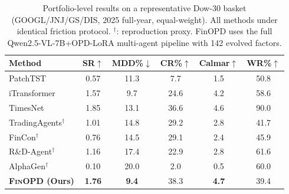 \begin{table}[t]
\renewcommand{\arraystretch}{0.95}
\footnotesize
\caption{Portfolio-level results on a representative Dow-30 basket (GOOGL/JNJ/GS/DIS, 2025 full-year, equal-weight). All methods under identical friction protocol. $^\dagger$: reproduction proxy. FinOPD uses the full Qwen2.5-VL-7B+OPD-LoRA multi-agent pipeline with 142 evolved factors.}
\setlength{\abovecaptionskip}{0.1cm}
\centering
\setlength{\tabcolsep}{3pt}
\begin{tabular}{lccccc}
\toprule
Method & SR$\uparrow$ & MDD\%$\downarrow$ & CR\%$\uparrow$ & Calmar$\uparrow$ & WR\%$\uparrow$ \\
\midrule
PatchTST & 0.57 & 11.3 & 7.7 & 1.5 & 50.8 \\
iTransformer & 1.57 & 9.7 & 24.6 & 4.2 & 58.6 \\
TimesNet & 1.85 & 13.1 & 36.6 & 4.6 & 90.0 \\
\midrule
TradingAgents$^\dagger$ & 1.01 & 14.8 & 29.2 & 2.8 & 41.7 \\
FinCon$^\dagger$ & 0.76 & 14.5 & 29.1 & 2.4 & 45.9 \\
R\&D-Agent$^\dagger$ & 1.16 & 17.4 & 22.9 & 2.8 & 61.6 \\
AlphaGen$^\dagger$ & 0.10 & 20.0 & 2.0 & 0.5 & 60.0 \\
\midrule
\textbf{\textsc{FinOPD} (Ours)} & \textbf{1.76} & \textbf{9.4} & 38.3 & \textbf{4.7} & 39.4 \\
\bottomrule
\end{tabular}
\label{tab:overall}
\end{table}
